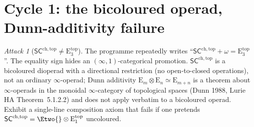 \documentclass{article}
\theoremstyle{definition}
\theoremstyle{remark}
\newtheorem{attack}[theorem]{Attack}
\newcommand{\SCchtop}{\mathsf{SC}^{\mathrm{ch,top}}}
\newcommand{\Etop}[1]{\mathrm{E}_{#1}^{\mathrm{top}}}
\begin{document}
\section{Cycle 1: the bicoloured operad, Dunn-additivity failure}
\label{sec:cycle-1}

\begin{attack}[$\SCchtop \neq \Etop{3}$]
The programme repeatedly writes ``$\SCchtop + \omega = \Etop{3}$''.
The equality sign hides an $(\infty,1)$-categorical promotion.
$\SCchtop$ is a bicoloured dioperad with a directional restriction
(no open-to-closed operations), not an ordinary $\infty$-operad; Dunn
additivity $\mathrm{E}_m \otimes \mathrm{E}_n \simeq \mathrm{E}_{m+n}$
is a theorem about $\infty$-operads in the monoidal
$\infty$-category of topological spaces (Dunn 1988, Lurie HA
Theorem~5.1.2.2) and does not apply verbatim to a bicoloured
operad. Exhibit a single-line composition axiom that fails if one
pretends $\SCchtop = \Etwo{} \otimes \Etop{1}$ uncoloured.
\end{attack}
\end{document}

